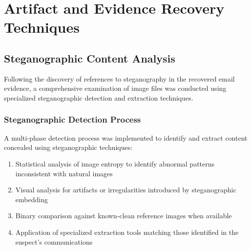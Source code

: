 \chapter{Artifact and Evidence Recovery Techniques}

\section{Steganographic Content Analysis}
Following the discovery of references to steganography in the recovered email evidence, a comprehensive examination of image files was conducted using specialized steganographic detection and extraction techniques.

\subsection{Steganographic Detection Process}
A multi-phase detection process was implemented to identify and extract content concealed using steganographic techniques:

\begin{enumerate}
    \item Statistical analysis of image entropy to identify abnormal patterns inconsistent with natural images
    \item Visual analysis for artifacts or irregularities introduced by steganographic embedding
    \item Binary comparison against known-clean reference images when available
    \item Application of specialized extraction tools matching those identified in the suspect's communications
\end{enumerate}

